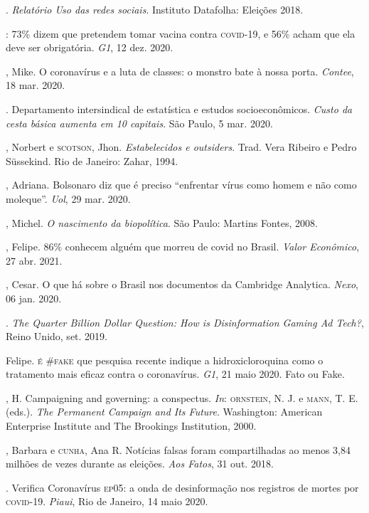 \begin{bibliohedra}
. \textit{Relatório Uso das redes sociais}. Instituto
Datafolha: Eleições 2018.

: 73\% dizem que pretendem tomar vacina contra
\textsc{covid-19}, e 56\% acham que ela deve ser obrigatória. \textit{G1}, 12 dez. 2020.

, Mike. O coronavírus e a luta de classes: o monstro bate
à nossa porta. \textit{Contee}, 18 mar. 2020.

. Departamento intersindical de estatística e estudos socioeconômicos. \textit{Custo da cesta básica aumenta em 10 capitais}. São Paulo, 5 mar. 2020.

, Norbert e \textsc{scotson}, Jhon. \textit{Estabelecidos e outsiders}.
Trad. Vera Ribeiro e Pedro Süssekind. Rio de Janeiro: Zahar, 1994.

, Adriana. Bolsonaro diz que é preciso ``enfrentar vírus como homem e não como moleque''. \textit{Uol}, 29 mar. 2020.

, Michel. \textit{O nascimento da biopolítica}. São Paulo:
Martins Fontes, 2008.

, Felipe. 86\% conhecem alguém que morreu de covid no Brasil. \textit{Valor Econômico}, 27 abr. 2021.

, Cesar. O que há sobre o Brasil nos documentos da
Cambridge Analytica. \textit{Nexo}, 06 jan. 2020.

. \textit{The Quarter Billion Dollar
Question: How is Disinformation Gaming Ad Tech?}, Reino Unido, set. 2019.

 Felipe. \textsc{é \#fake} que pesquisa recente indique a
hidroxicloroquina como o tratamento mais eficaz contra o coronavírus. \textit{G1}, 21 maio 2020. Fato ou Fake.

, H. Campaigning and governing: a conspectus. \textit{In}: \textsc{ornstein}, N. J. e \textsc{mann}, T. E. (eds.). \textit{The Permanent Campaign and Its Future}. Washington:
American Enterprise Institute and The Brookings Institution, 2000.

, Barbara e \textsc{cunha}, Ana R. Notícias falsas foram
compartilhadas ao menos 3,84 milhões de vezes durante as eleições. \textit{Aos
Fatos}, 31 out. 2018.

. Verifica Coronavírus \textsc{ep05}: a onda de desinformação nos
registros de mortes por \textsc{covid-19}. \textit{Piaui}, Rio de Janeiro, 14 maio 2020.


\end{bibliohedra}
